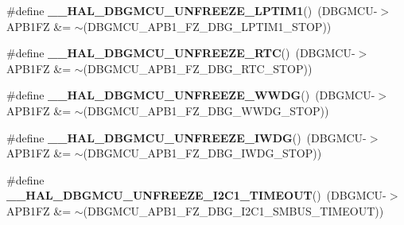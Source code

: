 \begin{DoxyCompactItemize}
\item 
\mbox{\label{group___h_a_l___exported___macros_gae8c5b2ecee4a1f6ac3b8b24711a10584}} 
\#define {\bfseries \+\_\+\+\_\+\+H\+A\+L\+\_\+\+D\+B\+G\+M\+C\+U\+\_\+\+U\+N\+F\+R\+E\+E\+Z\+E\+\_\+\+L\+P\+T\+I\+M1}()~(D\+B\+G\+M\+CU-\/$>$A\+P\+B1\+FZ \&= $\sim$(D\+B\+G\+M\+C\+U\+\_\+\+A\+P\+B1\+\_\+\+F\+Z\+\_\+\+D\+B\+G\+\_\+\+L\+P\+T\+I\+M1\+\_\+\+S\+T\+OP))
\item 
\mbox{\label{group___h_a_l___exported___macros_ga3d85d5cda1979c7df426634a1d3d7d35}} 
\#define {\bfseries \+\_\+\+\_\+\+H\+A\+L\+\_\+\+D\+B\+G\+M\+C\+U\+\_\+\+U\+N\+F\+R\+E\+E\+Z\+E\+\_\+\+R\+TC}()~(D\+B\+G\+M\+CU-\/$>$A\+P\+B1\+FZ \&= $\sim$(D\+B\+G\+M\+C\+U\+\_\+\+A\+P\+B1\+\_\+\+F\+Z\+\_\+\+D\+B\+G\+\_\+\+R\+T\+C\+\_\+\+S\+T\+OP))
\item 
\mbox{\label{group___h_a_l___exported___macros_gaa14c8a2e8911976b8c8ce6ca278372a2}} 
\#define {\bfseries \+\_\+\+\_\+\+H\+A\+L\+\_\+\+D\+B\+G\+M\+C\+U\+\_\+\+U\+N\+F\+R\+E\+E\+Z\+E\+\_\+\+W\+W\+DG}()~(D\+B\+G\+M\+CU-\/$>$A\+P\+B1\+FZ \&= $\sim$(D\+B\+G\+M\+C\+U\+\_\+\+A\+P\+B1\+\_\+\+F\+Z\+\_\+\+D\+B\+G\+\_\+\+W\+W\+D\+G\+\_\+\+S\+T\+OP))
\item 
\mbox{\label{group___h_a_l___exported___macros_gab29a88ef9c31cbe107c58b9ecc3bdf79}} 
\#define {\bfseries \+\_\+\+\_\+\+H\+A\+L\+\_\+\+D\+B\+G\+M\+C\+U\+\_\+\+U\+N\+F\+R\+E\+E\+Z\+E\+\_\+\+I\+W\+DG}()~(D\+B\+G\+M\+CU-\/$>$A\+P\+B1\+FZ \&= $\sim$(D\+B\+G\+M\+C\+U\+\_\+\+A\+P\+B1\+\_\+\+F\+Z\+\_\+\+D\+B\+G\+\_\+\+I\+W\+D\+G\+\_\+\+S\+T\+OP))
\item 
\mbox{\label{group___h_a_l___exported___macros_ga636083d6b6931b1cf35e7c39aebf0723}} 
\#define {\bfseries \+\_\+\+\_\+\+H\+A\+L\+\_\+\+D\+B\+G\+M\+C\+U\+\_\+\+U\+N\+F\+R\+E\+E\+Z\+E\+\_\+\+I2\+C1\+\_\+\+T\+I\+M\+E\+O\+UT}()~(D\+B\+G\+M\+CU-\/$>$A\+P\+B1\+FZ \&= $\sim$(D\+B\+G\+M\+C\+U\+\_\+\+A\+P\+B1\+\_\+\+F\+Z\+\_\+\+D\+B\+G\+\_\+\+I2\+C1\+\_\+\+S\+M\+B\+U\+S\+\_\+\+T\+I\+M\+E\+O\+UT))
\item 
\mbox{\label{group___h_a_l___exported___macros_ga0308bdec86c19b7bbe236c4724d7d536}} 

\end{DoxyCompactItemize}
